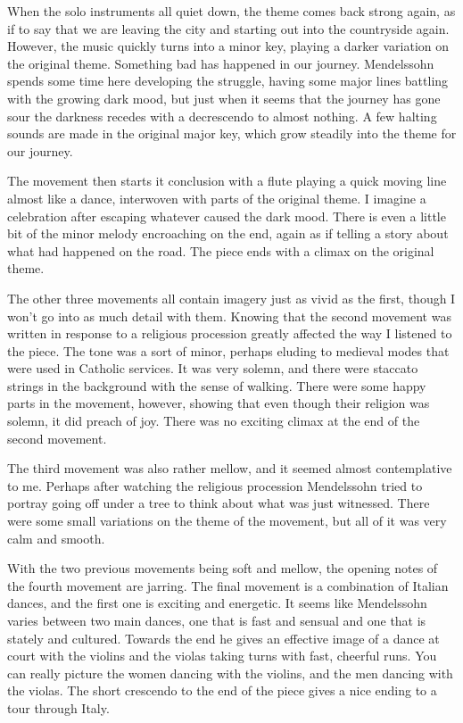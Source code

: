 \documentclass[onecolumn, 12pt]{article}
\begin{document}
When the solo instruments all quiet down, the theme comes back strong again, as
if to say that we are leaving the city and starting out into the countryside
again.  However, the music quickly turns into a minor key, playing a darker
variation on the original theme.  Something bad has happened in our journey.
Mendelssohn spends some time here developing the struggle, having some major
lines battling with the growing dark mood, but just when it seems that the
journey has gone sour the darkness recedes with a decrescendo to almost
nothing.  A few halting sounds are made in the original major key, which grow
steadily into the theme for our journey.

The movement then starts it conclusion with a flute playing a quick moving line
almost like a dance, interwoven with parts of the original theme.  I imagine a
celebration after escaping whatever caused the dark mood.  There is even a
little bit of the minor melody encroaching on the end, again as if telling a
story about what had happened on the road.  The piece ends with a climax on
the original theme.

The other three movements all contain imagery just as vivid as the first,
though I won't go into as much detail with them.  Knowing that the second
movement was written in response to a religious procession greatly affected the
way I listened to the piece.  The tone was a sort of minor, perhaps eluding to
medieval modes that were used in Catholic services.  It was very solemn, and
there were staccato strings in the background with the sense of walking.  There
were some happy parts in the movement, however, showing that even though their
religion was solemn, it did preach of joy.  There was no exciting climax at the
end of the second movement.

The third movement was also rather mellow, and it seemed almost contemplative
to me.  Perhaps after watching the religious procession Mendelssohn tried to
portray going off under a tree to think about what was just witnessed.  There
were some small variations on the theme of the movement, but all of it was very
calm and smooth.

With the two previous movements being soft and mellow, the opening notes of the
fourth movement are jarring.  The final movement is a combination of Italian
dances, and the first one is exciting and energetic.  It seems like Mendelssohn
varies between two main dances, one that is fast and sensual and one that is
stately and cultured.  Towards the end he gives an effective image of a dance
at court with the violins and the violas taking turns with fast, cheerful runs.
You can really picture the women dancing with the violins, and the men dancing
with the violas.  The short crescendo to the end of the piece gives a nice
ending to a tour through Italy.
\end{document}
